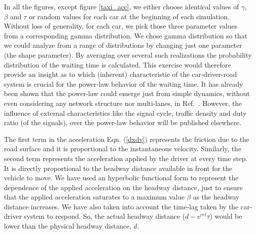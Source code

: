 \documentclass[conference]{IEEEtran}
\begin{document}
In all the figures, except figure \ref{taxi_acc}, we either choose identical values of $\gamma$, $\beta$ and $\tau$ or random values for each car at the beginning of each simulation.%
Without loss of generality, for each car, we pick those three parameter values from a corresponding gamma distribution. We chose gamma distribution so that we could analyze from a range of distributions by changing just one parameter (the shape parameter). By averaging over several such realizations the probability distribution of the waiting time is calculated. This exercise would therefore provide an insight as to which (inherent) characteristic of the car-driver-road system is crucial for the power-law behavior of the waiting time. It has already been shown that the power-law could emerge just from simple dynamics, without even considering any network structure nor multi-lanes, in Ref.~\cite{Majith2016}. However, the influence of external characteristics like the signal cycle, traffic density and duty ratio (of the signals), over the power-law behavior will be published elsewhere.

The first term in the acceleration Eqn. (\ref{dxdv}) represents the friction due to the road surface and it is proportional to the instantaneous velocity. Similarly, the second term represents the acceleration applied by the driver at every time step. It is directly proportional to the headway distance available in front for the vehicle to move. We have used an hyperbolic functional form to represent the dependence of the applied acceleration on the headway distance, just to ensure that the applied acceleration saturates to a maximum value $\beta$ as the headway distance increases. We have also taken into account the time-lag taken by the car-driver system to respond. So, the actual headway distance ($d-v^{rel}\tau$) would be lower than the physical headway distance, $d$. %
\end{document}
